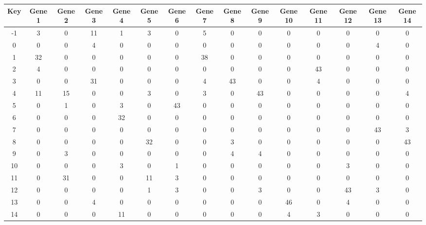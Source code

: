 \begin{tabular}{|c|c|c|c|c|c|c|c|c|c|c|c|c|c|c|}
\hline
Key & Gene 1 & Gene 2 & Gene 3 & Gene 4 & Gene 5 & Gene 6 & Gene 7 & Gene 8 & Gene 9 & Gene 10 & Gene 11 & Gene 12 & Gene 13 & Gene 14 \\
\hline
-1 & 3 & 0 & 11 & 1 & 3 & 0 & 5 & 0 & 0 & 0 & 0 & 0 & 0 & 0 \\
0 & 0 & 0 & 4 & 0 & 0 & 0 & 0 & 0 & 0 & 0 & 0 & 0 & 4 & 0 \\
1 & 32 & 0 & 0 & 0 & 0 & 0 & 38 & 0 & 0 & 0 & 0 & 0 & 0 & 0 \\
2 & 4 & 0 & 0 & 0 & 0 & 0 & 0 & 0 & 0 & 0 & 43 & 0 & 0 & 0 \\
3 & 0 & 0 & 31 & 0 & 0 & 0 & 4 & 43 & 0 & 0 & 4 & 0 & 0 & 0 \\
4 & 11 & 15 & 0 & 0 & 3 & 0 & 3 & 0 & 43 & 0 & 0 & 0 & 0 & 4 \\
5 & 0 & 1 & 0 & 3 & 0 & 43 & 0 & 0 & 0 & 0 & 0 & 0 & 0 & 0 \\
6 & 0 & 0 & 0 & 32 & 0 & 0 & 0 & 0 & 0 & 0 & 0 & 0 & 0 & 0 \\
7 & 0 & 0 & 0 & 0 & 0 & 0 & 0 & 0 & 0 & 0 & 0 & 0 & 43 & 3 \\
8 & 0 & 0 & 0 & 0 & 32 & 0 & 0 & 3 & 0 & 0 & 0 & 0 & 0 & 43 \\
9 & 0 & 3 & 0 & 0 & 0 & 0 & 0 & 4 & 4 & 0 & 0 & 0 & 0 & 0 \\
10 & 0 & 0 & 0 & 3 & 0 & 1 & 0 & 0 & 0 & 0 & 0 & 3 & 0 & 0 \\
11 & 0 & 31 & 0 & 0 & 11 & 3 & 0 & 0 & 0 & 0 & 0 & 0 & 0 & 0 \\
12 & 0 & 0 & 0 & 0 & 1 & 3 & 0 & 0 & 3 & 0 & 0 & 43 & 3 & 0 \\
13 & 0 & 0 & 4 & 0 & 0 & 0 & 0 & 0 & 0 & 46 & 0 & 4 & 0 & 0 \\
14 & 0 & 0 & 0 & 11 & 0 & 0 & 0 & 0 & 0 & 4 & 3 & 0 & 0 & 0 \\
\hline
\end{tabular}